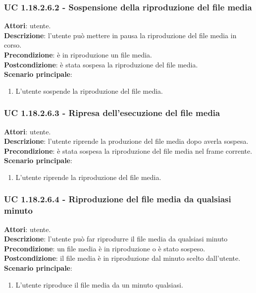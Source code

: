 	\subsubsection{UC 1.18.2.6.2 - Sospensione della riproduzione del file media}{
		\label{uc1.18.2.6.2}
		\textbf{Attori}: utente. \\
		\textbf{Descrizione}: l'utente può mettere in pausa la riproduzione del file media in corso. \\
		\textbf{Precondizione}: è in riproduzione un file media.	\\
		\textbf{Postcondizione}: è stata sospesa la riproduzione del file media.\\
		\textbf{Scenario principale}:
		\begin{enumerate}
			\item L'utente sospende la riproduzione del file media.
		\end{enumerate}				
	}
	\subsubsection{UC 1.18.2.6.3 - Ripresa dell'esecuzione del file media}{
		\label{uc1.18.2.6.3}
		\textbf{Attori}: utente. \\
		\textbf{Descrizione}: l'utente riprende la produzione del file media dopo averla sospesa. \\
		\textbf{Precondizione}: è stata sospesa la riproduzione del file media nel frame corrente.\\
		\textbf{Scenario principale}:
		\begin{enumerate}
			\item L'utente riprende la riproduzione del file media.
		\end{enumerate}				
	}
	\subsubsection{UC 1.18.2.6.4 - Riproduzione del file media da qualsiasi minuto}{
		\label{uc1.18.2.6.4}
		\textbf{Attori}: utente. \\
		\textbf{Descrizione}: l'utente può far riprodurre il file media da qualsiasi minuto
		\textbf{Precondizione}: un file media è in riproduzione o è stato sospeso.	\\
		\textbf{Postcondizione}: il file media è in riproduzione dal minuto scelto dall'utente.\\
		\textbf{Scenario principale}:
		\begin{enumerate}
			\item L'utente riproduce il file media da un minuto qualsiasi. 
		\end{enumerate}				
	}
